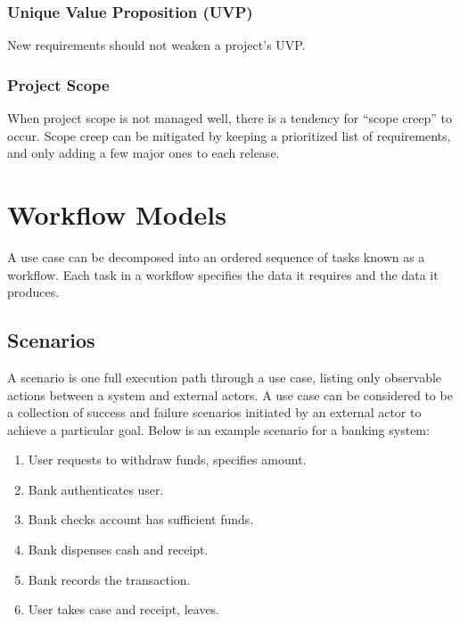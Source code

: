 \documentclass[12pt,titlepage]{article}
\let\stdsection\section
\renewcommand\section{\clearpage\stdsection}
\begin{document}
        \subsubsection{Unique Value Proposition (UVP)}
          New requirements should not weaken a project's UVP.

        \subsubsection{Project Scope}
          When project scope is not managed well, there is a tendency for ``scope creep'' to occur. Scope creep can be mitigated by keeping a
          prioritized list of requirements, and only adding a few major ones to each release.

  \section{Workflow Models}
    A use case can be decomposed into an ordered sequence of tasks known as a workflow. Each task in a workflow specifies the data it requires
    and the data it produces.

    \subsection{Scenarios}
      A scenario is one full execution path through a use case, listing only observable actions between a system and external actors. A use case can
      be considered to be a collection of success and failure scenarios initiated by an external actor to achieve a particular goal. Below is an example
      scenario for a banking system:
      \begin{enumerate}
        \item User requests to withdraw funds, specifies amount.
        \item Bank authenticates user.
        \item Bank checks account has sufficient funds.
        \item Bank dispenses cash and receipt.
        \item Bank records the transaction.
        \item User takes case and receipt, leaves.
      \end{enumerate}
\end{document}
